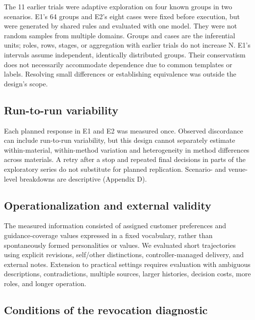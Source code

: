 \documentclass[10pt,a4paper]{article}
\begin{document}
The 11 earlier trials were adaptive exploration on four known groups in two scenarios. E1's 64 groups and E2's eight cases were fixed before execution, but were generated by shared rules and evaluated with one model. They were not random samples from multiple domains. Groups and cases are the inferential units; roles, rows, stages, or aggregation with earlier trials do not increase N. E1's intervals assume independent, identically distributed groups. Their conservatism does not necessarily accommodate dependence due to common templates or labels. Resolving small differences or establishing equivalence was outside the design's scope.

\subsection{Run-to-run variability}\label{paper-01-run-to-run-variability}

Each planned response in E1 and E2 was measured once. Observed discordance can include run-to-run variability, but this design cannot separately estimate within-material, within-method variation and heterogeneity in method differences across materials. A retry after a stop and repeated final decisions in parts of the exploratory series do not substitute for planned replication. Scenario- and venue-level breakdowns are descriptive (Appendix D).

\subsection{Operationalization and external validity}\label{paper-01-operationalization-and-external-validity}

The measured information consisted of assigned customer preferences and guidance-coverage values expressed in a fixed vocabulary, rather than spontaneously formed personalities or values. We evaluated short trajectories using explicit revisions, self/other distinctions, controller-managed delivery, and external notes. Extension to practical settings requires evaluation with ambiguous descriptions, contradictions, multiple sources, larger histories, decision costs, more roles, and longer operation.

\subsection{Conditions of the revocation diagnostic}\label{paper-01-conditions-of-the-revocation-diagnostic}
\end{document}
